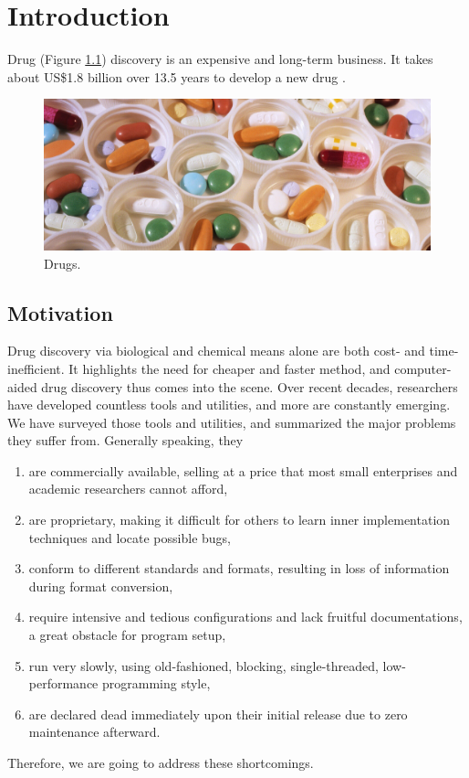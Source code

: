 \chapter{Introduction}

Drug (Figure \ref{Background:Drugs}) discovery is an expensive and long-term business. It takes about US\$1.8 billion over 13.5 years to develop a new drug \citep{716}.

\begin{figure}[h]
\centering
\includegraphics[width=\textwidth]{Background/Drugs.jpg}
\caption{Drugs.}
\label{Background:Drugs}
\end{figure}

\section{Motivation}

Drug discovery via biological and chemical means alone are both cost- and time-inefficient. It highlights the need for cheaper and faster method, and computer-aided drug discovery thus comes into the scene. Over recent decades, researchers have developed countless tools and utilities, and more are constantly emerging. We have surveyed those tools and utilities, and summarized the major problems they suffer from. Generally speaking, they
\begin{enumerate}
\item are commercially available, selling at a price that most small enterprises and academic researchers cannot afford,
\item are proprietary, making it difficult for others to learn inner implementation techniques and locate possible bugs,
\item conform to different standards and formats, resulting in loss of information during format conversion,
\item require intensive and tedious configurations and lack fruitful documentations, a great obstacle for program setup,
\item run very slowly, using old-fashioned, blocking, single-threaded, low-performance programming style,
\item are declared dead immediately upon their initial release due to zero maintenance afterward.
\end{enumerate}
Therefore, we are going to address these shortcomings.

